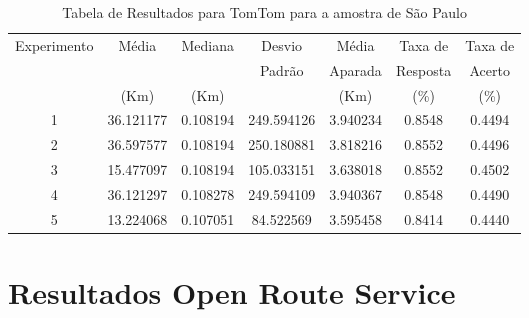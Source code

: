\begin{anexosenv}
\begin{table}[ht]
    \centering
    \begin{tabular}{|c|c|c|c|c|c|c|}
    \hline
    Experimento & Média & Mediana & Desvio & Média & Taxa de & Taxa de \\
        & & & Padrão & Aparada & Resposta & Acerto \\
        & (Km) & (Km) & & (Km) & (\%) & (\%) \\ \hline
    1 & 36.121177 & 0.108194 & 249.594126 & 3.940234 & 0.8548 & 0.4494 \\ \hline
    2 & 36.597577 & 0.108194 & 250.180881 & 3.818216 & 0.8552 & 0.4496 \\ \hline
    3 & 15.477097 & 0.108194 & 105.033151 & 3.638018 & 0.8552 & 0.4502 \\ \hline
    4 & 36.121297 & 0.108278 & 249.594109 & 3.940367 & 0.8548 & 0.4490 \\ \hline
    5 & 13.224068 & 0.107051 & 84.522569 & 3.595458 & 0.8414 & 0.4440 \\ \hline
    \end{tabular}
    \caption{Tabela de Resultados para TomTom para a amostra de São Paulo}
    \label{tab:tomtomSP}
\end{table}


\section{Resultados Open Route Service}


\end{anexosenv}
